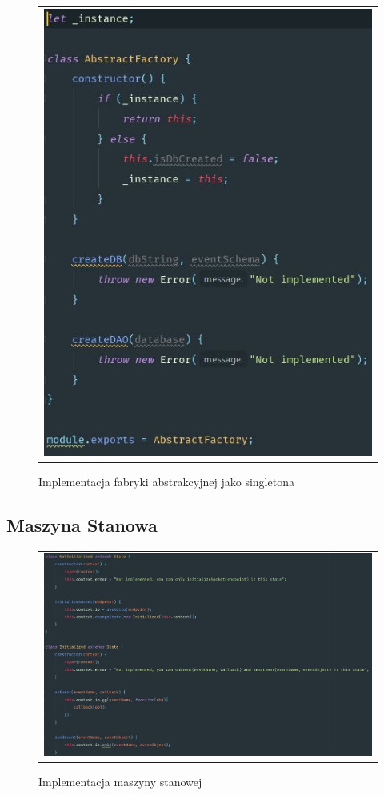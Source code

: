 \documentclass{sprawozdanie-agh}
\begin{document}
	\begin{figure}[H] 
		\centering
		\begin{tabular}{c}
			\includegraphics[width=.75\textwidth]{singleton}
		\end{tabular} 
		\caption{Implementacja fabryki abstrakcyjnej jako singletona}
	\end{figure}
	
	\subsection{Maszyna Stanowa}
	
	\begin{figure}[H] 
		\centering
		\begin{tabular}{c}
			\includegraphics[width=.99\textwidth]{statemachine}
		\end{tabular} 
		\caption{Implementacja maszyny stanowej}
	\end{figure}
\end{document}
